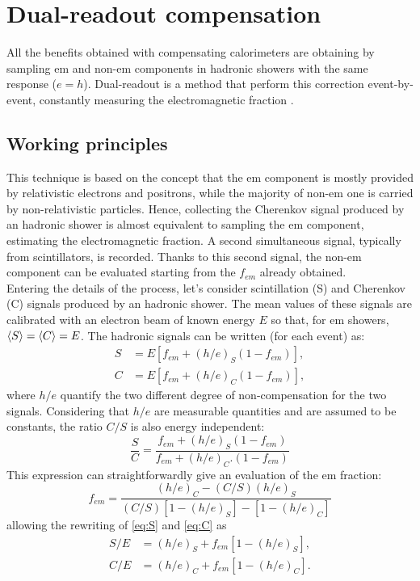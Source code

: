 \section{Dual-readout compensation}\label{sec:DRComp}
All the benefits obtained with compensating calorimeters are obtaining by sampling em and non-em components in hadronic showers with the same response ($e=h$). Dual-readout is a method that perform this correction event-by-event, constantly measuring the electromagnetic fraction \cite{DR_Wig}. 

\subsection{Working principles}
This technique is based on the concept that the em component is mostly provided by relativistic electrons and positrons, while the majority of non-em one is carried by non-relativistic particles. Hence, collecting the Cherenkov signal produced by an hadronic shower is almost equivalent to sampling the em component, estimating the electromagnetic fraction. A second simultaneous signal, typically from scintillators, is recorded. Thanks to this second signal, the non-em component can be evaluated starting from the $f_{em}$ already obtained.\\

Entering the details of the process, let's consider scintillation (S) and Cherenkov (C) signals produced by an hadronic shower. The mean values of these signals are calibrated with an electron beam of known energy $E$ so that, for em showers, $\expval{S} = \expval{C} = E$. The hadronic signals can be written (for each event) as:
\begin{align}
    S &= E \left[f_{em} + (h/e)_S (1-f_{em}) \right], \label{eq:S} \\
    C &= E \left[f_{em} + (h/e)_C (1-f_{em}) \right], \label{eq:C}
\end{align}
where $h/e$ quantify the two different degree of non-compensation for the two signals. Considering that $h/e$ are measurable quantities and are assumed to be constants, the ratio $C/S$ is also energy independent:
\begin{equation}
    \frac{S}{C} = \frac{f_{em} + (h/e)_S (1-f_{em})}{f_{em} + (h/e)_C. (1-f_{em})} \label{eq:em_frac}
\end{equation}
This expression can straightforwardly give an evaluation of the em fraction:
\begin{equation}
    f_{em} = \frac{(h/e)_C-(C/S)(h/e)_S}{(C/S)\left[1-(h/e)_S\right]-\left[1-(h/e)_C\right]}
\end{equation}
allowing the rewriting of \ref{eq:S} and \ref{eq:C} as
\begin{align}
    S/E &= (h/e)_S + f_{em}\left[1-(h/e)_S\right], \label{eq:S2} \\
    C/E &= (h/e)_C + f_{em}\left[1-(h/e)_C\right]. \label{eq:C2}
\end{align}

